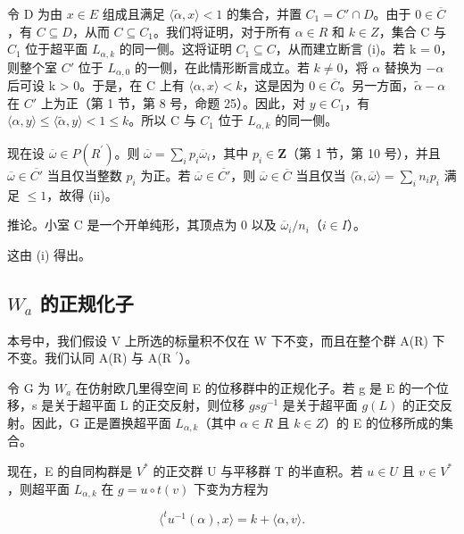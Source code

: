 令 D 为由 \(x \in E\) 组成且满足 \(\langle\tilde{\alpha}, x\rangle < 1\) 的集合，并置 \(C_{1} = C' \cap D\)。由于 \(0 \in \overline{C}\)，有 \(C \subseteq D\)，从而 \(C \subseteq C_{1}\)。我们将证明，对于所有 \(\alpha \in R\) 和 \(k \in Z\)，集合 C 与 \(C_{1}\) 位于超平面 \(L_{\alpha,k}\) 的同一侧。这将证明 \(C_{1} \subseteq C\)，从而建立断言 (i)。若 k = 0，则整个室 \(C'\) 位于 \(L_{\alpha,0}\) 的一侧，在此情形断言成立。若 \(k \neq 0\)，将 \(\alpha\) 替换为 \(-\alpha\) 后可设 k \textgreater{} 0。于是，在 C 上有 \(\langle\alpha, x\rangle < k\)，这是因为 \(0 \in \overline{C}\)。另一方面，\(\tilde{\alpha} - \alpha\) 在 \(C'\) 上为正（第 1 节，第 8 号，命题 25）。因此，对 \(y \in C_{1}\)，有 \(\langle\alpha, y\rangle \leqslant \langle\tilde{\alpha}, y\rangle < 1 \leqslant k\)。所以 C 与 \(C_{1}\) 位于 \(L_{\alpha,k}\) 的同一侧。

现在设 \(\overline{\omega} \in P(R^{\prime})\)。则 \(\overline{\omega} = \sum_{i} p_i \overline{\omega}_i\)，其中 \(p_i \in \mathbf{Z}\)（第 1 节，第 10 号），并且 \(\overline{\omega} \in \overline{C'}\) 当且仅当整数 \(p_i\) 为正。若 \(\overline{\omega} \in \overline{C'}\)，则 \(\overline{\omega} \in \overline{C}\) 当且仅当 \(\langle \tilde{\alpha}, \overline{\omega} \rangle = \sum_{i} n_i p_i\) 满足 \(\leqslant 1\)，故得 (ii)。

推论。小室 C 是一个开单纯形，其顶点为 0 以及 \(\overline{\omega}_i / n_i\)（\(i \in I\)）。

这由 (i) 得出。

\subsection{\texorpdfstring{\(W_{a}\) 的正规化子}{W\_a 的正规化子}}

本号中，我们假设 V 上所选的标量积不仅在 W 下不变，而且在整个群 A(R) 下不变。我们认同 A(R) 与 A(R \(^{\prime}\)）。

令 G 为 \(W_{a}\) 在仿射欧几里得空间 E 的位移群中的正规化子。若 g 是 E 的一个位移，s 是关于超平面 L 的正交反射，则位移 \(gsg^{-1}\) 是关于超平面 \(g(L)\) 的正交反射。因此，G 正是置换超平面 \(L_{\alpha,k}\)（其中 \(\alpha \in R\) 且 \(k \in Z\)）的 E 的位移所成的集合。

现在，E 的自同构群是 \(V^{*}\) 的正交群 U 与平移群 T 的半直积。若 \(u \in U\) 且 \(v \in V^{*}\)，则超平面 \(L_{\alpha,k}\) 在 \(g = u \circ t(v)\) 下变为方程为

\[
\langle^ {t} u ^ {- 1} (\alpha), x \rangle = k + \langle \alpha , v \rangle .
\]

